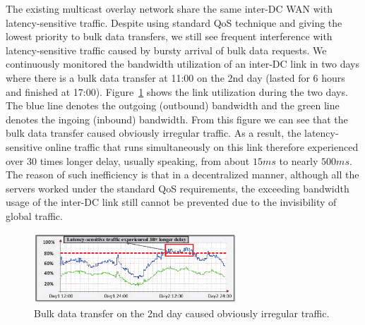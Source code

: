 
The existing multicast overlay network share the same inter-DC WAN
with latency-sensitive traffic.
Despite using standard QoS technique and giving the lowest priority to
bulk data transfers, we still see frequent interference with
latency-sensitive traffic caused by bursty arrival of bulk data
requests.
We continuously monitored the bandwidth utilization of an inter-DC
link in two days where there is a bulk data transfer at 11:00 on the
2nd day (lasted for 6 hours and finished at 17:00).
Figure~\ref{fig:lesson2} shows the link utilization during the two
days. The blue line denotes the outgoing (outbound) bandwidth and the green line denotes the ingoing (inbound) bandwidth. From this figure we can see that the bulk data transfer caused
obviously irregular traffic. As a result, the latency-sensitive online
traffic that runs simultaneously on this link therefore experienced over
30 times longer delay, usually speaking,
from about $15ms$ to nearly $500ms$. The reason of such inefficiency is that in a decentralized manner, although all the servers worked under the standard QoS requirements, the exceeding bandwidth usage of the inter-DC link still cannot be prevented due to the invisibility of global traffic.


\begin{figure}[t]
        \center
        \includegraphics[width=3in]{images/nj02-M2A_0212-0216_v2.eps}
        \caption{Bulk data transfer on the 2nd day caused obviously irregular traffic.}
        \label{fig:lesson2}
\end{figure}




